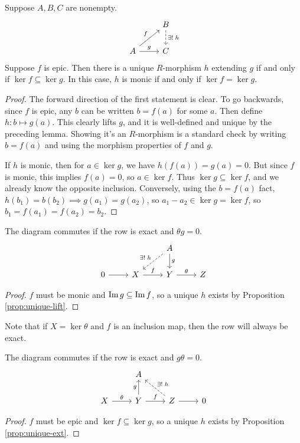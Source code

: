 \documentclass[twoside,10pt]{report}
\begin{document}
\begin{prop}
	\label{prop:unique-ext}
	Suppose $A, B, C$ are nonempty.
	\[
	\begin{tikzcd}
		& B \dar[dashed]{\exists! \; h} \\
		A \arrow[ur, "f"] \rar{g} & C
	\end{tikzcd}
	\] 
	Suppose $f$ is epic. Then there is a unique $R$-morphism $h$ extending $g$ if and only if $\ker f \subseteq \ker g$. In this case, $h$ is monic if and only if $\ker f=\ker g$.
\end{prop}
\begin{proof}
	The forward direction of the first statement is clear. To go backwards, since $f$ is epic, any $b$ can be written $b=f(a)$ for some $a$. Then define $h:b \mapsto g(a)$. This clearly lifts $g$, and it is well-defined and unique by the preceding lemma. Showing it's an $R$-morphism is a standard check by writing $b=f(a)$ and using the morphism properties of $f$ and $g$.

	If $h$ is monic, then for $a \in \ker g$, we have $h(f(a)) = g(a)=0$. But since $f$ is monic, this implies $f(a)=0$, so $a \in \ker f$. Thus $\ker g \subseteq \ker f$, and we already know the opposite inclusion. Conversely, using the $b=f(a)$ fact, $h(b_1)=b(b_2)\implies g(a_1)=g(a_2)$, so $a_1-a_2 \in \ker g = \ker  f$, so $b_1=f(a_1) = f(a_2)=b_2$.
\end{proof}

\begin{prop}
The diagram commutes if the row is exact and $\theta g= 0$.
\[
\begin{tikzcd}
	& & A \arrow[dl, dashed, "\exists! \;h"'] \dar{g} \\
	0 \rar & X \rar{f} & Y \rar{\theta} & Z
\end{tikzcd}
\] 
\end{prop}
\begin{proof}
	$f$ must be monic and $\operatorname{Im} g \subseteq \operatorname{Im} f$, so a unique $h$ exists by Proposition \ref{prop:unique-lift}.
\end{proof}

Note that if $X = \ker \theta$ and $f$ is an inclusion map, then the row will always be exact.

\begin{prop}
The diagram commutes if the row is exact and $g \theta=0$.
\[
\begin{tikzcd}
	& A \\
	X \rar{\theta} & Y \uar{g}\rar{f} & Z \rar\arrow[ul, dashed, "\exists!\; h"'] & 0
\end{tikzcd}
\] 
\end{prop}
\begin{proof}
	$f$ must be epic and $\ker f \subseteq \ker g$, so a unique $h$ exists by Proposition \ref{prop:unique-ext}.
\end{proof}
\end{document}
